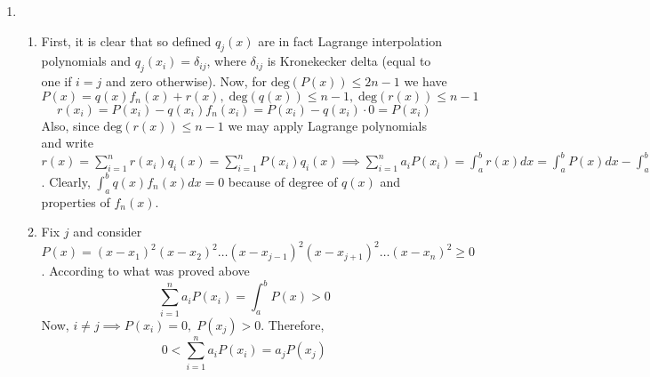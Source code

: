 \documentclass[8pt]{article} %
\begin{document}
\begin{enumerate}[label=\bfseries\arabic*.]
{\[=\frac{b-a}{2}\int_{-1}^1P_n(t)\sum_{i=0}^k(\frac{b-a}{2})^it^i (\frac{b+a}{2})^{(k-i)}dt=\]
\[=\sum_{i=0}^k(\frac{b-a}{2})^{(i+1)}
(\frac{b+a}{2})^{(k-i)}\int_{-1}^1 P_n(t)t^i dt=\sum_{i=0}^k(\frac{b-a}{2})^{(i+1)}(\frac{b+a}{2})^{(k-i)}\cdot0=0\]
Finally, to show that the zeros of $f_n(x)$ are distinct real numbers in $(a,b)$ we will do as follows. First, assume that $f_n(x)$ has some some
double or complex roots. Then, $f_n(x)=(x-x_1)(x-x_2)\dots(x-x_k)p_1(x)p_2(x)\dots p_l(x)$, where $p_i(x)$ are of the form $p_i(x)=(x-\alpha_i)^2$
or $p_i(x)=(x-\alpha_i)(x-\bar{\alpha}_i)$ and are formed from the presence of multiple roots or complex roots (latter will occur in
conjugate pairs). Since polynomials $p_i(x)$ are non-negative (on real line),
 we may consider the polynomial $t(x)=(x-x_1)\dots(x-x_k)$ of degree smaller than $n$.
Then, we should have $\int_a^b f_n(x)t(x)dx=0$. But $\int_a^b f_n(x)t(x)dx=\int_a^b (x-x_1)^2\dots(x-x_k)^2\dots p_1(x)\dots p_l(x)dx>0$ and we
arrived at contradiction. Finally, assume that some zero $x_0$ of $f_n(x)$ is outside $(a,b)$. Then, $f_n(x)=(x-x_0)q(x)$ and since degree
of $q(x)$ is smaller than $n$ we must have $\int_a^b f_n(x)q(x)dx=\int_a^b (x-x_0)q^2(x)dx=0$. But $q^2(x)$ is non-negative and $x-x_0$ \textit{
	does not change sign} on $(a,b)$, therefore expression in the last integral does not change sign on $(a,b)$ and cannot give zero
	integral, unless it's equal to zero, which is not true. We again arrived at contradiction.
}
\item{
	\begin{enumerate}[label=(\arabic*)]
	\item{First, it is clear that so defined $q_j(x)$ are in fact Lagrange interpolation polynomials and $q_j(x_i)=\delta_{ij}$, where 
	$\delta_{ij}$ is Kronekecker delta (equal to one if $i=j$ and zero otherwise). Now, for $\text{deg}(P(x))\leq 2n-1$ we have
	\[P(x)=q(x)f_n(x)+r(x),\;\text{deg}(q(x)) \leq n-1,\;\text{deg}(r(x)) \leq n-1\]
	\[r(x_i)=P(x_i)-q(x_i)f_n(x_i)=P(x_i)-q(x_i)\cdot 0=P(x_i)\]
	Also, since $\text{deg}(r(x)) \leq n-1$ we may apply Lagrange polynomials and write $r(x)=\sum_{i=1}^n r(x_i)q_i(x)=\sum_{i=1}^n P(x_i)
	q_i(x)\implies \sum_{i=1}^n a_i P(x_i)=\int_a^b r(x)dx=\int_a^b P(x)dx-\int_a^b q(x)f_n(x)dx=\int_a^bP(x)dx$. Clearly,
	$\int_a^b q(x)f_n(x)dx=0$ because of degree of $q(x)$ and properties of $f_n(x)$.}
	\item{Fix $j$ and consider $P(x)=(x-x_1)^2(x-x_2)^2\dots(x-x_{j-1})^2(x-x_{j+1})^2\dots(x-x_n)^2\geq 0$. According to what was proved above
	\[\sum_{i=1}^n a_iP(x_i)=\int_a^b P(x)>0\]Now, $i\neq j\implies P(x_i)=0,\;P(x_j)>0$. Therefore, \[0<\sum_{i=1}^n a_iP(x_i)=a_jP(x_j)
\]}
\end{enumerate}}
\end{enumerate}
\end{document}
